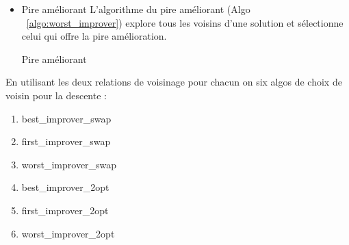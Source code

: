 \begin{itemize}
\begin{algorithm}[H]
\begin{algorithmic}[1]
			\State {}
			\EndIf
			\EndFor
		\State {}
			\EndFunction
			
		\end{algorithmic}
	\end{algorithm}
	
	\item Pire améliorant
	L'algorithme du pire améliorant (Algo ~\ref{algo:worst_improver}) explore tous les voisins d'une solution et sélectionne celui qui offre la pire amélioration.
	
		\begin{algorithm}[H]
		\caption{Pire améliorant}
		\label{algo:worst_improver}
		\begin{algorithmic}[1]
			\Statex
			
			
			                
			\EndIf
			\EndFor
			\State {}
			\EndFunction
			
		\end{algorithmic}
	\end{algorithm}
	
\end{itemize}

En utilisant les deux relations de voisinage pour chacun on six algos de choix de voisin pour la descente :
\begin{enumerate}
	\item best\_improver\_swap
	\item first\_improver\_swap
	\item worst\_improver\_swap
	\item best\_improver\_2opt
	\item first\_improver\_2opt
	\item worst\_improver\_2opt
\end{enumerate}

